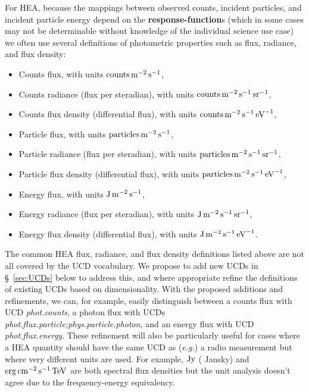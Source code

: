 \documentclass[11pt,a4paper]{ivoa}
\begin{document}
For \gls{HEA}, because the mappings between observed counts, incident particles, and incident particle energy depend on the {\bf response-function}s (which in some cases may not be determinable without knowledge of the individual science use case) we often use several definitions of photometric properties such as flux, radiance, and flux density:

\begin{itemize}
\item Counts flux, with units $\rm\hbox{counts}\,m^{-2}\,s^{-1}$,
\item Counts radiance (flux per steradian), with units $\rm\hbox{counts}\,m^{-2}\,s^{-1}\,\hbox{sr}^{-1}$,
\item Counts flux density (differential flux), with units $\rm\hbox{counts}\,m^{-2}\,s^{-1}\,\hbox{eV}^{-1}$,
\item Particle flux, with units $\rm\hbox{particles}\,m^{-2}\,s^{-1}$,
\item Particle radiance (flux per steradian), with units $\rm\hbox{particles}\,m^{-2}\,s^{-1}\,\hbox{sr}^{-1}$,
\item Particle flux density (differential flux), with units $\rm\hbox{particles}\,m^{-2}\,s^{-1}\,\hbox{eV}^{-1}$,
\item Energy flux, with units $\rm J\,m^{-2}\,s^{-1}$,
\item Energy radiance (flux per steradian), with units $\rm J\,m^{-2}\,s^{-1}\,\hbox{sr}^{-1}$,
\item Energy flux density (differential flux), with units $\rm J\,m^{-2}\,s^{-1}\,\hbox{eV}^{-1}$.
\end{itemize}

The common \gls{HEA} flux, radiance, and flux density definitions listed above are not all covered by the UCD vocabulary.   We propose to add new UCDs in \S~\ref{sec:UCDs} below to address this, and where appropriate refine the definitions of existing UCDs based on dimensionality.  With the proposed additions and refinements, we can, for example, easily distinguish between a counts flux with UCD {\em phot.counts\/}, a photon flux with UCDs {\em phot.flux.particle;phys.particle.photon\/}, and an energy flux with UCD {\em phot.\-flux.energy\/}.  These refinement will also be particularly useful for cases where a \gls{HEA} quantity should have the same UCD as ({\em e.g.\/}) a radio measurement but where very different units are used. For example, $\rm Jy$ ( Jansky) and $\rm erg\,cm^{-2}\,s^{-1}\,TeV$ are both spectral flux densities but the unit analysis doesn’t agree due to the frequency-energy equivalency.
\end{document}
